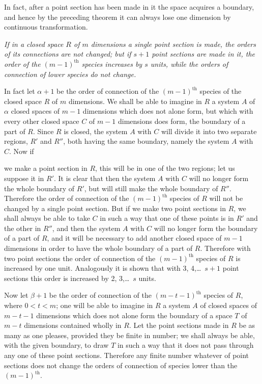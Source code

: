 \documentclass{article}
\begin{document}
In fact, after a point section has been made in it the space acquires a boundary, and hence by the preceding theorem it can always lose one dimension by continuous transformation.

\emph{If in a closed space $R$ of $m$ dimensions a single point section is made, the orders of its connections are not changed; but if $s+1$ point sections are made in it, the order of the $(m-1)^{\text{th}}$ species increases by $s$ units, while the orders of connection of lower species do not change.}

In fact let $\alpha+1$ be the order of connection of the $(m-1)^{\text{th}}$ species of the closed space $R$ of $m$ dimensions. We shall be able to imagine in $R$ a system $A$ of $\alpha$ closed spaces of $m-1$ dimensions which does not alone form, but which with every other closed space $C$ of $m-1$ dimensions does form, the boundary of a part of $R$. Since $R$ is closed, the system $A$ with $C$ will divide it into two separate regions, $R'$ and $R''$, both having the same boundary, namely the system $A$ with $C$. Now if

we make a point section in $R$, this will be in one of the two regions; let us suppose it in $R'$. It is clear that then the system $A$ with $C$ will no longer form the whole boundary of $R'$, but will still make the whole boundary of $R''$. Therefore the order of connection of the $(m-1)^{\text{th}}$ species of $R$ will not be changed by a single point section. But if we make two point sections in $R$, we shall always be able to take $C$ in such a way that one of these points is in $R'$ and the other in $R''$, and then the system $A$ with $C$ will no longer form the boundary of a part of $R$, and it will be necessary to add another closed space of $m-1$ dimensions in order to have the whole boundary of a part of $R$. Therefore with two point sections the order of connection of the $(m-1)^{\text{th}}$ species of $R$ is increased by one unit. Analogously it is shown that with 3, 4,\ldots\ $s+1$ point sections this order is increased by 2, 3,\ldots\ $s$ units.

Now let $\beta+1$ be the order of connection of the $(m-t-1)^{\text{th}}$ species of $R$, where $0 < t < m$; one will be able to imagine in $R$ a system $A$ of closed spaces of $m-t-1$ dimensions which does not alone form the boundary of a space $T$ of $m-t$ dimensions contained wholly in $R$. Let the point sections made in $R$ be as many as one pleases, provided they be finite in number; we shall always be able, with the given boundary, to draw $T$ in such a way that it does not pass through any one of these point sections. Therefore any finite number whatever of point sections does not change the orders of connection of species lower than the $(m-1)^{\text{th}}$.
\end{document}
